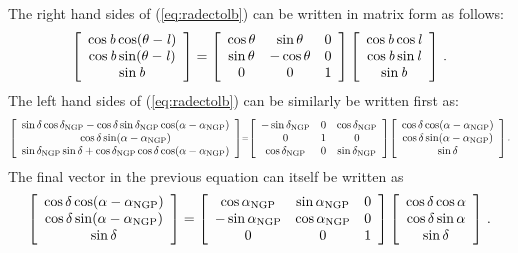 The right hand sides of (\ref{eq:radectolb}) can be written in matrix
form as follows:
\begin{equation}\label{eq:radectolbmatrix1}
\left[ \begin{array}{c} \cos {\it b} \cos (\theta - {\it l}) \\ \cos {\it b} \sin(\theta-{\it l})\\ \sin {\it b} \end{array} \right]  = 
\left[ \begin{array}{ccc} \cos \theta & \sin \theta & 0\\\sin \theta & -\cos \theta & 0\\0&0&1 \end{array} \right]
\left[ \begin{array}{c} \cos {\it b} \cos {\it l} \\ \cos {\it b} \sin {\it l} \\ \sin {\it b} \end{array} \right]\, .
\end{equation}
The left hand sides of (\ref{eq:radectolb}) can be similarly be written first as:
\begin{equation}\scriptstyle\label{eq:radectolbmatrix2}
\left[ \begin{array}{c} \sin\delta \cos\delta_{\textnormal{NGP}} - \cos\delta \sin\delta_{\textnormal{NGP}} \cos(\alpha-\alpha_{\textnormal{NGP}})\\ 
\cos \delta \sin (\alpha-\alpha_{\textnormal{NGP}})\\
\sin \delta_{\textnormal{NGP}} \sin \delta + \cos\delta_{\textnormal{NGP}} \cos\delta \cos(\alpha-\alpha_{\textnormal{NGP}}) \end{array} \right] = 
\left[ \begin{array}{ccc} -\sin \delta_{\textnormal{NGP}} & 0 & \cos \delta_{\textnormal{NGP}}\\ 0 & 1 & 0 \\ \cos \delta_{\textnormal{NGP}} & 0 & \sin \delta_{\textnormal{NGP}}\end{array} \right] 
\left[ \begin{array}{c} \cos \delta \cos(\alpha - \alpha_{\textnormal{NGP}})\\\cos \delta \sin(\alpha-\alpha_{\textnormal{NGP}})\\\sin\delta \end{array} \right]\, .
\end{equation}
The final vector in the previous equation can itself be written as
\begin{equation}\label{eq:radectolbmatrix3}
\left[ \begin{array}{c} \cos \delta \cos(\alpha - \alpha_{\textnormal{NGP}})\\\cos \delta \sin(\alpha-\alpha_{\textnormal{NGP}})\\\sin\delta \end{array} \right] = 
\left[ \begin{array}{ccc} \cos \alpha_{\textnormal{NGP}} &\sin\alpha_{\textnormal{NGP}}&0\\ -\sin\alpha_{\textnormal{NGP}} & \cos\alpha_{\textnormal{NGP}}&0\\ 0&0&1\end{array} \right]
\left[ \begin{array}{c} \cos \delta \cos \alpha \\ \cos \delta \sin \alpha \\ \sin \delta \end{array} \right]\, .
\end{equation}

